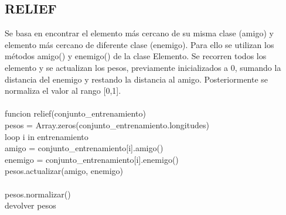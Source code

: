 \documentclass[12pt, spanish]{article}
\newcommand\tab[1][1cm]{\hspace*{#1}}
\begin{document}
\subsection{RELIEF }
Se basa en encontrar el elemento más cercano de su misma clase (amigo) y elemento más cercano de diferente clase (enemigo). Para ello se utilizan los métodos amigo() y enemigo() de la clase Elemento. Se recorren todos los elemento y se actualizan los pesos, previamente inicializados a 0, sumando la distancia del enemigo y restando la distancia al amigo. Posteriormente se normaliza el valor al rango [0,1]. \\
\\
funcion relief(conjunto\_entrenamiento) {\\
\tab	pesos = Array.zeros(conjunto\_entrenamiento.longitudes)\\
\tab	loop i in entrenamiento {\\
\tab\tab		amigo = conjunto\_entrenamiento[i].amigo() \\
\tab\tab		enemigo = conjunto\_entrenamiento[i].enemigo() \\
\tab		pesos.actualizar(amigo, enemigo) \\
	}\\
\tab	pesos.normalizar() \\
\tab	devolver pesos\\
}\\

\pagebreak
\end{document}
